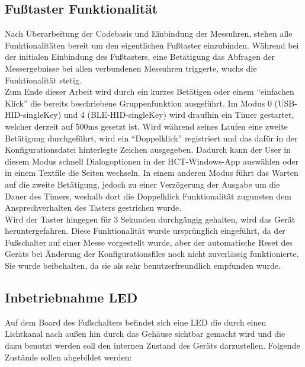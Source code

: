 \subsection{Fußtaster Funktionalität}
Nach Überarbeitung der Codebasis und Einbindung der Messuhren, stehen alle Funktionalitäten bereit um den eigentlichen Fußtaster einzubinden. Während bei der initialen Einbindung des Fußtasters, eine Betätigung das Abfragen der Messergebnisse bei allen verbundenen Messuhren triggerte, wuchs die Funktionalität stetig.\\
Zum Ende dieser Arbeit wird durch ein kurzes Betätigen oder einem ``einfachen Klick'' die bereits beschriebene Gruppenfunktion ausgeführt. Im Modus 0 (USB-\ac{HID}-singleKey) und 4 (\ac{BLE}-\ac{HID}-singleKey) wird draufhin ein Timer gestartet, welcher derzeit auf 500ms gesetzt ist. Wird während seines Laufen eine zweite Betätigung durchgeführt, wird ein ``Doppelklick'' registriert und das dafür in der Konfigurationsdatei hinterlegte Zeichen ausgegeben. Dadurch kann der User in diesem Modus schnell Dialogoptionen in der \ac{HCT}-Windows-App auswählen oder in einem Textfile die Seiten wechseln. In einem anderen Modus führt das Warten auf die zweite Betätigung, jedoch zu einer Verzögerung der Ausgabe um die Dauer des Timers, weshalb dort die Doppelklick Funktionalität zugunsten dem Ansprechverhalten des Tasters gestrichen wurde.\\
Wird der Taster hingegen für 3 Sekunden durchgängig gehalten, wird das Gerät heruntergefahren. Diese Funktionalität wurde ursprünglich eingeführt, da der Fußschalter auf einer Messe vorgestellt wurde, aber der automatische Reset des Geräts bei Änderung der Konfigurationsfiles noch nicht zuverlässig funktionierte. Sie wurde beibehalten, da sie als sehr benutzerfreundlich empfunden wurde.

\subsection{Inbetriebnahme LED}
Auf dem Board des Fußschalters befindet sich eine LED die durch einen Lichtkanal nach außen hin durch das Gehäuse sichtbar gemacht wird und die dazu benutzt werden soll den internen Zustand des Geräts darzustellen. Folgende Zustände sollen abgebildet werden: 

